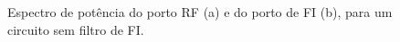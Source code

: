 \documentclass[11pt]{article}
\numberwithin{equation}{section}
\begin{document}
\begin{figure}[h]
	\centering
	\hspace{8mm}
	\vspace{-0.8em}
	\caption{Espectro de potência do porto RF (a) e do porto de FI (b), para um circuito sem filtro de FI.}
	\vspace{-0.8em}
\end{figure}
\end{document}
